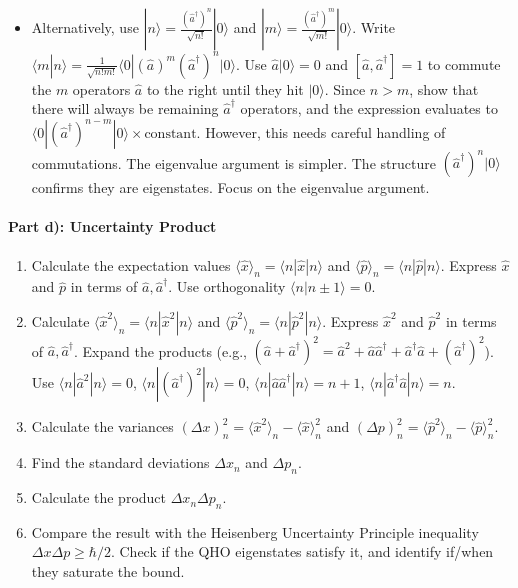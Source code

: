 \documentclass[10pt]{article}
\begin{document}
\begin{enumerate}
\begin{itemize}
            \item Alternatively, use \(|n\rangle = \frac{(\hat{a}^\dagger)^n}{\sqrt{n!}}|0\rangle\) and \(|m\rangle = \frac{(\hat{a}^\dagger)^m}{\sqrt{m!}}|0\rangle\). Write \(\langle m|n\rangle = \frac{1}{\sqrt{n!m!}} \langle 0 | (\hat{a})^m (\hat{a}^\dagger)^n | 0 \rangle\). Use \(\hat{a}|0\rangle=0\) and \([\hat{a}, \hat{a}^\dagger]=1\) to commute the \(m\) operators \(\hat{a}\) to the right until they hit \(|0\rangle\). Since \(n > m\), show that there will always be remaining \(\hat{a}^\dagger\) operators, and the expression evaluates to \(\langle 0 | (\hat{a}^\dagger)^{n-m} | 0 \rangle \times \text{constant}\). However, this needs careful handling of commutations. The eigenvalue argument is simpler. The structure \((\hat{a}^\dagger)^n|0\rangle\) confirms they are eigenstates. Focus on the eigenvalue argument.
        \end{itemize}
\end{enumerate}

\paragraph{Part d): Uncertainty Product}
\begin{enumerate}
    \item Calculate the expectation values \(\langle \hat{x} \rangle_n = \langle n | \hat{x} | n \rangle\) and \(\langle \hat{p} \rangle_n = \langle n | \hat{p} | n \rangle\). Express \(\hat{x}\) and \(\hat{p}\) in terms of \(\hat{a}, \hat{a}^\dagger\). Use orthogonality \(\langle n|n\pm 1\rangle=0\).
    \item Calculate \(\langle \hat{x}^2 \rangle_n = \langle n | \hat{x}^2 | n \rangle\) and \(\langle \hat{p}^2 \rangle_n = \langle n | \hat{p}^2 | n \rangle\). Express \(\hat{x}^2\) and \(\hat{p}^2\) in terms of \(\hat{a}, \hat{a}^\dagger\). Expand the products (e.g., \((\hat{a}+\hat{a}^\dagger)^2 = \hat{a}^2 + \hat{a}\hat{a}^\dagger + \hat{a}^\dagger\hat{a} + (\hat{a}^\dagger)^2\)). Use \(\langle n | \hat{a}^2 | n \rangle = 0\), \(\langle n | (\hat{a}^\dagger)^2 | n \rangle = 0\), \(\langle n | \hat{a}\hat{a}^\dagger | n \rangle = n+1\), \(\langle n | \hat{a}^\dagger\hat{a} | n \rangle = n\).
    \item Calculate the variances \((\Delta x)_n^2 = \langle \hat{x}^2 \rangle_n - \langle \hat{x} \rangle_n^2\) and \((\Delta p)_n^2 = \langle \hat{p}^2 \rangle_n - \langle \hat{p} \rangle_n^2\).
    \item Find the standard deviations \(\Delta x_n\) and \(\Delta p_n\).
    \item Calculate the product \(\Delta x_n \Delta p_n\).
    \item Compare the result with the Heisenberg Uncertainty Principle inequality \(\Delta x \Delta p \ge \hbar/2\). Check if the QHO eigenstates satisfy it, and identify if/when they saturate the bound.
\end{enumerate}
\end{document}
